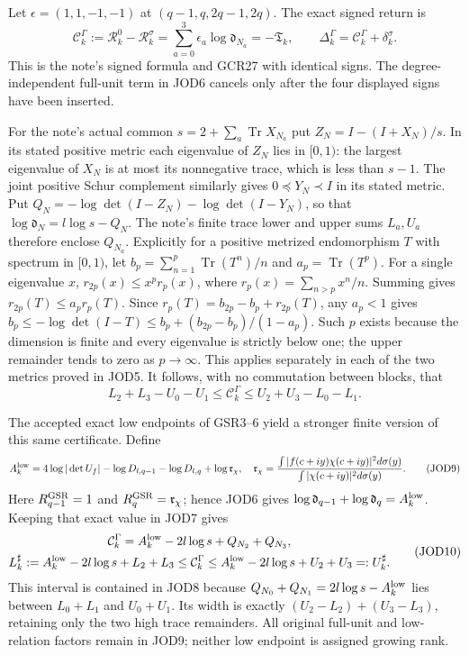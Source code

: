Let $\epsilon=(1,1,-1,-1)$ at $(q-1,q,2q-1,2q)$. The exact
signed return is
\[
 \mathcal C_k^{\Gamma}:=\mathcal R_k^0-\mathcal R_k^\sigma
 =\sum_{a=0}^3\epsilon_a\log\mathfrak d_{N_a}
 =-\mathfrak T_k,\qquad
 \Delta_k^\Gamma=\mathcal C_k^\Gamma+\delta_k^\sigma.
 \tag{JOD7}
\]
This is the note's signed formula and GCR27 with identical
signs. The degree-independent full-unit term in JOD6 cancels
only after the four displayed signs have been inserted.

For the note's actual common $s=2+\sum_a\operatorname{Tr}X_{N_a}$
put $Z_N=I-(I+X_N)/s$. In its stated positive metric each
eigenvalue of $Z_N$ lies in $[0,1)$: the largest eigenvalue
of $X_N$ is at most its nonnegative trace, which is less than
$s-1$. The joint positive Schur complement similarly gives
$0\preceq Y_N\prec I$ in its stated metric. Put
$Q_N=-\log\det(I-Z_N)-\log\det(I-Y_N)$, so that
$\log\mathfrak d_N=l\log s-Q_N$. The note's finite trace
lower and upper sums $L_a,U_a$ therefore enclose $Q_{N_a}$.
Explicitly for a positive metrized endomorphism $T$ with
spectrum in $[0,1)$, let $b_p=\sum_{n=1}^p\operatorname{Tr}(T^n)/n$
and $a_p=\operatorname{Tr}(T^p)$. For a single eigenvalue $x$,
$r_{2p}(x)\leq x^pr_p(x)$, where
$r_p(x)=\sum_{n>p}x^n/n$. Summing gives
$r_{2p}(T)\leq a_pr_p(T)$. Since
$r_p(T)=b_{2p}-b_p+r_{2p}(T)$, any $a_p<1$ gives
$b_p\leq-\log\det(I-T)\leq b_p+(b_{2p}-b_p)/(1-a_p)$.
Such $p$ exists because the dimension is finite and every
eigenvalue is strictly below one; the upper remainder tends
to zero as $p\to\infty$. This applies separately in each
of the two metrics proved in JOD5.
It follows, with no commutation between blocks, that
\[
 L_2+L_3-U_0-U_1\leq\mathcal C_k^\Gamma
                 \leq U_2+U_3-L_0-L_1.
 \tag{JOD8}
\]

The accepted exact low endpoints of GSR3--6 yield a stronger
finite version of this same certificate. Define
\[
 A_k^{\rm low}=4\log|\det U_f|
    -\log D_{l,q-1}-\log D_{l,q}+\log\mathfrak r_\chi,
 \quad
 \mathfrak r_\chi=\frac{\int|f(c+iy)\chi(c+iy)|^2d\sigma(y)}
                       {\int|\chi(c+iy)|^2d\sigma(y)}.
 \tag{JOD9}
\]
Here $R_{q-1}^{\rm GSR}=1$ and $R_q^{\rm GSR}=\mathfrak r_\chi$;
hence JOD6 gives
$\log\mathfrak d_{q-1}+\log\mathfrak d_q=A_k^{\rm low}$.
Keeping that exact value in JOD7 gives
\[
\begin{gathered}
 \mathcal C_k^\Gamma=A_k^{\rm low}-2l\log s+Q_{N_2}+Q_{N_3},\\
 L_k^\sharp:=A_k^{\rm low}-2l\log s+L_2+L_3
 \leq\mathcal C_k^\Gamma
 \leq A_k^{\rm low}-2l\log s+U_2+U_3=:U_k^\sharp.
\end{gathered}\tag{JOD10}
\]
This interval is contained in JOD8 because
$Q_{N_0}+Q_{N_1}=2l\log s-A_k^{\rm low}$ lies between
$L_0+L_1$ and $U_0+U_1$. Its width is exactly
$(U_2-L_2)+(U_3-L_3)$, retaining only the two high trace
remainders. All original full-unit and low-relation factors
remain in JOD9; neither low endpoint is assigned growing rank.

